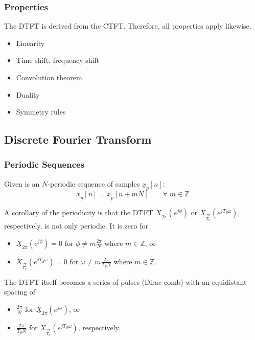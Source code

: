 \begin{refsection}
\subsubsection{Properties}

The \ac{DTFT} is derived from the \ac{CTFT}. Therefore, all properties apply likewise.
\begin{itemize}
	\item Linearity
	\item Time shift, frequency shift
	\item Convolution theorem
	\item Duality
	\item Symmetry rules
\end{itemize}

\subsection{Discrete Fourier Transform}

\subsubsection{Periodic Sequences}

Given is an $N$-periodic sequence of samples $\underline{x}_p[n]$:
\begin{equation}
	\underline{x}_p[n] = \underline{x}_p[n + mN] \qquad \forall \; m \in \mathbb{Z}
\end{equation}

A corollary of the periodicity is that the \ac{DTFT} $\underline{X}_{2 \pi} \left(e^{j \phi}\right)$ or $\underline{X}_{\frac{2\pi}{T_S}} \left(e^{j T_S \omega}\right)$, respectively, is not only periodic. It is zero for
\begin{itemize}
	\item $\underline{X}_{2 \pi} \left(e^{j \phi}\right) = 0$ for $\phi \neq m \frac{2\pi}{N}$ where $m \in \mathbb{Z}$, or
	\item $\underline{X}_{\frac{2\pi}{T_S}} \left(e^{j T_S \omega}\right) = 0$ for $\omega \neq m \frac{2\pi}{T_S N}$ where $m \in \mathbb{Z}$.
\end{itemize}
The \ac{DTFT} itself becomes a series of pulses (Dirac comb) with an equidistant spacing of
\begin{itemize}
	\item $\frac{2\pi}{N}$ for $\underline{X}_{2 \pi} \left(e^{j \phi}\right)$, or
	\item $\frac{2\pi}{T_S N}$ for $\underline{X}_{\frac{2\pi}{T_S}} \left(e^{j T_S \omega}\right)$, respectively.
\end{itemize}


\end{refsection}
